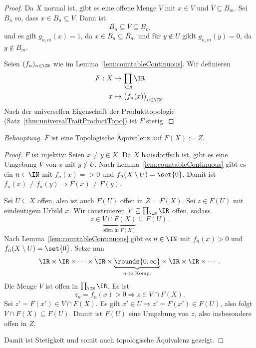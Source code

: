 \documentclass[language=ngerman]{TemplateLecture} %
\begin{document}
\begin{enumerate}
\begin{proof}
        Da $X$ normal ist, gibt es eine offene Menge $V$ mit $x \in V$ und $\overline{V} \subseteq B_m$. Sei $B_n$ so, dass $x \in B_n \subseteq V$. Dann ist
        \begin{equation*}
            \overline{B_n} \subseteq \overline{V} \subseteq B_m
        \end{equation*}
        und es gilt $g_{n,m}(x) = 1$, da $x \in B_n \subseteq \overline{B_n}$, und für $y \notin U$ giklt $g_{n,m}(y) = 0$, da $y \notin B_m$.

        Seien $(f_n)_{n \in \IN}$ wie im Lemma~\ref{lem:countableContinuous}. Wir definieren 
        \begin{align*}
            F: X &\to \prod_\IN \IR \\
            x &\mapsto \bigl(f_n(x)\bigr)_{n \in \IN}.
        \end{align*}
        Nach der universellen Eigenschaft der Produkttopologie (Satz~\ref{thm:universalTraitProductTopo}) ist $F$ stetig.
        
    \end{proof}
    \emph{Behauptung.} $F$ ist eine Topologische Äquivalenz auf $F(X) := Z$.
    \begin{proof}
        $F$ ist injektiv: Seien $x \neq y \in X$. Da $X$ hausdorffsch ist, gibt es eine Umgebung $V$ von $x$ mit $y \notin U$. Nach Lemma~\ref{lem:countableContinuous} gibt es ein $n \in \IN$ mit $f_n(x) =  > 0$ und $f_n(X \setminus U) = \set{0}$. Damit ist $f_n(x) \neq f_n(y) \Rightarrow F(x) \neq F(y)$.

        Sei $U \subseteq X$ offen, also ist auch $F(U)$ offen in $Z = F(X)$. Sei $z \in F(U)$ mit eindeutigem Urbild $x$. Wir construieren $V \subseteq \prod_\IN \IR$ offen, sodass 
        \begin{equation*}
            z \in \underset{\text{offen in $F(X)$}}{\underbrace{V \cap F(X)}} \subseteq F(U).
        \end{equation*}
        Nach Lemma~\ref{lem:countableContinuous} gibt es $n \in \IN$ mit $f_n(x) > 0$ und $f_n(X \setminus U) = \set{0}$. Setze nun 
        \begin{equation*}
            \IR \times \IR \times \cdots \times \IR \times \underset{\text{$n$-te Komp.}}{\underbrace{\rounds{0,\infty}}} \times \IR \times \IR \times \cdots.
        \end{equation*}
        Die Menge $V$ ist offen in $\prod_\IN \IR$. Es ist 
        \begin{equation*}
            z_n = f_n(x) > 0 \Rightarrow z \in V \cap F(X). 
        \end{equation*}
        Sei $z' = F(x') \in V \cap F(X)$. Es gilt $x' \in U \Rightarrow z' = F(x') \in F(U)$, also folgt $V \cap F(X) \subseteq F(U)$. Damit ist $F(U)$ eine Umgebung von $z$, also insbesondere offen in $Z$.

        Damit ist Stetigkeit und somit auch topologische Äquivalenz gezeigt.
    \end{proof}
\end{enumerate}
\end{document}

